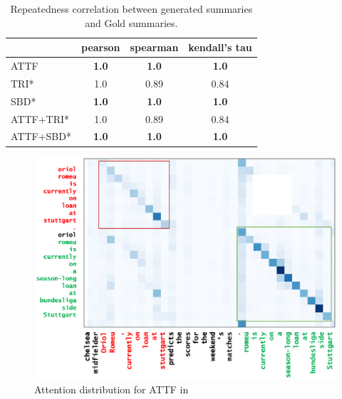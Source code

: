\begin{table}[th!]
        \centering
        \small
        \caption{Repeatedness correlation between generated summaries and Gold summaries.}
        \begin{tabular}{|l|c|c|c|}
                \hline
                     & pearson  & spearman & kendall's tau \\
                \hline
                ATTF & \bf 1.0 & \bf 1.0 & \bf 1.0 \\
                TRI* & 1.0 & 0.89 & 0.84  \\
                SBD* & \bf 1.0 & \bf 1.0 & \bf 1.0 \\
                ATTF+TRI* & 1.0 & 0.89 & 0.84 \\
                ATTF+SBD* & \bf 1.0 & \bf 1.0 & \bf 1.0 \\
                \hline
        \end{tabular}
        \label{tab:eval_repcor}
\end{table}

\begin{figure}[th!]
\centering
\includegraphics[width=0.84\columnwidth]{map3}
\caption{Attention distribution for ATTF in }
\label{fig:attn_map3}
\end{figure}
	
